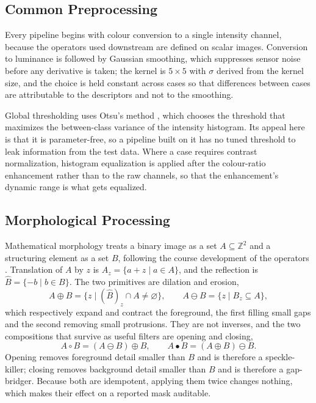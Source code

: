 \documentclass{ieeeaccess}
\begin{document}
\subsection{Common Preprocessing}
Every pipeline begins with colour conversion to a single intensity channel,
because the operators used downstream are defined on scalar images. Conversion
to luminance is followed by Gaussian smoothing, which suppresses sensor noise
before any derivative is taken; the kernel is $5\times5$ with
$\sigma$ derived from the kernel size, and the choice is held constant across
cases so that differences between cases are attributable to the descriptors and
not to the smoothing.

Global thresholding uses Otsu's method \cite{otsu1979}, which chooses the
threshold that maximizes the between-class variance of the intensity histogram.
Its appeal here is that it is parameter-free, so a pipeline built on it has no
tuned threshold to leak information from the test data. Where a case requires
contrast normalization, histogram equalization is applied after the colour-ratio
enhancement rather than to the raw channels, so that the enhancement's dynamic
range is what gets equalized.

\subsection{Morphological Processing}
\label{sec:morph}
Mathematical morphology treats a binary image as a set $A\subseteq\mathbb{Z}^2$
and a structuring element as a set $B$, following the course development of the
operators \cite{handouts}. Translation of $A$ by $z$ is
$A_z=\{a+z\mid a\in A\}$, and the reflection is $\hat{B}=\{-b\mid b\in B\}$. The
two primitives are dilation and erosion,
\begin{equation}
A\oplus B=\{z\mid(\hat{B})_z\cap A\neq\varnothing\},\qquad
A\ominus B=\{z\mid B_z\subseteq A\},
\label{eq:dilero}
\end{equation}
which respectively expand and contract the foreground, the first filling small
gaps and the second removing small protrusions. They are not inverses, and the
two compositions that survive as useful filters are opening and closing,
\begin{equation}
A\circ B=(A\ominus B)\oplus B,\qquad A\bullet B=(A\oplus B)\ominus B .
\label{eq:openclose}
\end{equation}
Opening removes foreground detail smaller than $B$ and is therefore a
speckle-killer; closing removes background detail smaller than $B$ and is
therefore a gap-bridger. Because both are idempotent, applying them twice
changes nothing, which makes their effect on a reported mask auditable.
\end{document}

